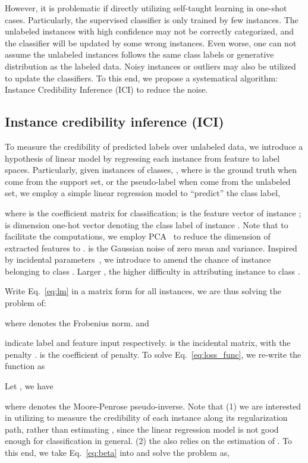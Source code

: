 \documentclass[10pt,letterpaper,twocolumn]{article}
\begin{document}
However, it is problematic if directly utilizing self-taught learning
in one-shot cases. Particularly, the supervised classifier 
is only trained by few instances. The unlabeled instances with high
confidence may  not be correctly categorized, and the classifier will
be updated by some wrong instances. Even worse, one can not assume
the unlabeled instances follows the same class labels or generative
distribution as the labeled data. Noisy instances or outliers may
also be utilized to update the classifiers. To this end, we propose
a systematical algorithm: Instance Credibility Inference (ICI) to reduce the noise.

\subsection{Instance credibility inference (ICI)}
To measure the credibility of predicted labels over unlabeled data, we introduce a hypothesis of linear model by regressing each instance from feature to label spaces.  Particularly, given   instances of  classes,
, where  is the ground truth when  come from the support set, or the pseudo-label when  come from the unlabeled set, we employ a simple linear regression model to ``predict'' the class label,


\noindent where  is the
coefficient matrix for classification; 
is the feature vector of instance ;  is  dimension
one-hot vector denoting the class label of instance . 
Note that to facilitate the computations, we employ PCA~\cite{tipping1999probabilistic} to reduce the dimension of extracted features  to . 
is the Gaussian noise of zero mean and  variance. 
Inspired by incidental parameters~\cite{fan2012partial}, 
we introduce  to amend the chance of instance  belonging to class  .
Larger , the higher difficulty in attributing instance  to  class  .


Write Eq.~\ref{eq:lm} in a matrix form for all instances, we are thus solving the problem of:

where  denotes the Frobenius norm.  and

indicate label and feature input respectively. 
is the incidental matrix, with the penalty .
 is the coefficient of penalty. To solve Eq.~\ref{eq:loss_func},
we re-write the function as 

Let , we have 


\noindent where  denotes the Moore-Penrose pseudo-inverse. 
Note that 
(1) we are interested in utilizing 
to measure the credibility of each instance along its regularization path, rather than estimating
, since the linear regression model is not good enough
for classification in general. 
(2) the  also relies
on the estimation of . 
To this end, we take Eq.~\ref{eq:beta}
into  and solve the problem
as,
\end{document}
